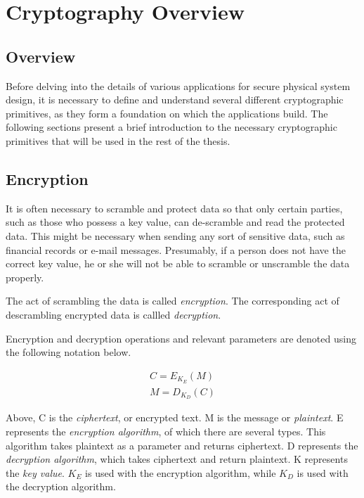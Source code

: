 
\chapter{Cryptography Overview}
\label{chapter:cryptographyoverview}

\section{Overview}
Before delving into the details of various applications for secure physical system design,
it is necessary to define and understand several different
cryptographic primitives, as they form a foundation on which the applications build. The following sections present a brief
introduction to the necessary cryptographic primitives that will be used in the rest of the thesis.

\section{Encryption}
It is often necessary to scramble and protect data so that only certain parties, such as those who
possess a key value, can de-scramble and read the protected data. This might be necessary when
sending any sort of sensitive data, such as financial records or e-mail messages. Presumably, if a 
person does not have the correct key value, he or she will not be able to scramble or unscramble
the data properly.

The act of scrambling the data is called \emph{encryption}. The corresponding act of descrambling
encrypted data is callled \emph{decryption}.

Encryption and decryption operations and relevant parameters are denoted using the following notation below.

\begin{align}
C = E_{K_E}(M) \\
M = D_{K_D}(C)
\end{align}

Above, C is the \emph{ciphertext}, or encrypted text.  
M is the message or \emph{plaintext}. 
E represents the \emph{encryption algorithm}, of which there are several types. This algorithm takes plaintext as a parameter and returns ciphertext.
D represents the \emph{decryption algorithm}, which takes ciphertext and return plaintext.
K represents the \emph{key value}. $K_E$ is used with the encryption algorithm, while $K_D$ is used with the decryption algorithm.

